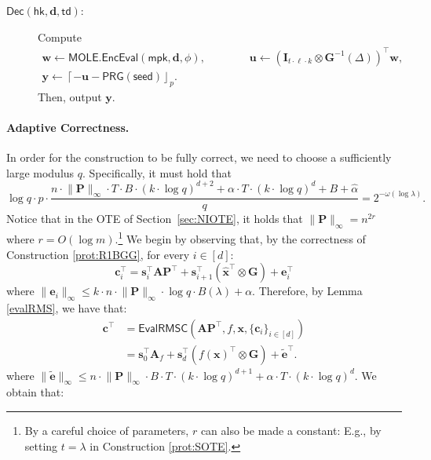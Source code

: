 \documentclass{theoretics}
\newcommand{\td}{\mathsf{td}}
\newcommand{\MOLE}{\mathsf{MOLE}}
\renewcommand{\sec}{\ensuremath{\lambda}}
\newcommand{\algofont}[1]{\ensuremath{\mathsf{#1}}}
\newcommand{\Enc}{{\algofont{Enc}}}
\newcommand{\Dec}{{\algofont{Dec}}}
\newcommand{\Eval}{\algofont{Eval}\xspace}
\newcommand{\id}{\ensuremath{\mathbf{I}}}
\newcommand{\mpk}{\mathsf{mpk}}
\newcommand{\hk}{\ensuremath{\mathsf{hk}}}
\newcommand{\secref}[1]{Section~\ref{sec:#1}}
\newenvironment{protocol}[1][]
{\begin{algorithm}\caption{#1}}
  {\end{algorithm}}
\begin{document}
\begin{protocol}[Input-Succinct Reverse TDH for RMS]
\begin{description}
\item[$\Dec(\hk, \mathbf{d}, \td)$:] Compute
\begin{gather*}
\mathbf{w}\gets \MOLE.\Enc\Eval(\mpk, \mathbf{d}, \phi), \qquad \qquad
\mathbf{u}\gets (\id_{t\cdot \ell\cdot k}\otimes \mathbf{G}^{-1}(\Delta))^\intercal \mathbf{w},\\
\mathbf{y}\gets \left\lceil -\mathbf{u}-\mathsf{PRG}(\mathsf{seed})\right\rfloor_p.
\end{gather*}
Then, output $\mathbf{y}$.
\end{description}
\end{protocol}

\paragraph{Adaptive Correctness.} In order for the construction to be fully correct, we need to choose a sufficiently large modulus $q$. Specifically, it must hold that 
\[\log q \cdot p\cdot \frac{n\cdot \lVert \mathbf{P}\rVert_\infty \cdot  T\cdot B \cdot (k\cdot \log q)^{d+2}+\alpha\cdot T\cdot (k\cdot \log q)^d+B+\hat{\alpha}}{q}=2^{-\omega(\log \sec)}.\] Notice that in the OTE of \secref{NIOTE}, it holds that $\lVert \mathbf{P}\rVert_\infty=n^{2r}$ where $r=O(\log m)$.\footnote{By a careful choice of parameters, $r$ can also be made a constant: E.g., by setting $t=\sec$ in Construction \ref{prot:SOTE}.}
We begin by observing that, by the correctness of Construction \ref{prot:R1BGG}, for every $i\in[d]$:
\[
\mathbf{c}_i^\intercal=\mathbf{s}_i^\intercal\mathbf{A}\mathbf{P}^\intercal+\mathbf{s}_{i+1}^\intercal(\hat{\mathbf{x}}^\intercal\otimes \mathbf{G})+\mathbf{e}_i^\intercal
\]
where $\lVert \mathbf{e}_i\rVert_\infty\le k\cdot n\cdot \lVert \mathbf{P}\rVert_\infty\cdot \log q \cdot B(\sec)+\alpha$.
Therefore, by Lemma \ref{evalRMS}, we have that:
\begin{align*}
\mathbf{c}^\intercal
&=\Eval\mathsf{RMSC}(\mathbf{A}\mathbf{P}^\intercal, f, \mathbf{x}, \{\mathbf{c}_i\}_{i\in[d]}) \\
&=\mathbf{s}_0^\intercal\mathbf{A}_f +\mathbf{s}_d^\intercal(f(\mathbf{x})^\intercal\otimes \mathbf{G})+\widetilde{\mathbf e}^\intercal.
\end{align*}
     where $\lVert \mathbf{\widetilde{e}}\rVert_\infty\le n\cdot \lVert \mathbf{P}\rVert_\infty\cdot B\cdot T\cdot (k\cdot \log q)^{d+1}+\alpha\cdot T\cdot (k\cdot \log q)^{d}$.
    We obtain that: 
\end{document}
